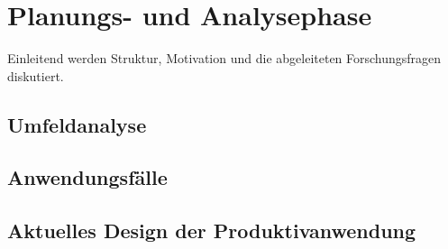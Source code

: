 

\chapter{Planungs- und Analysephase}

Einleitend werden Struktur, Motivation und die abgeleiteten Forschungsfragen diskutiert.

\section{Umfeldanalyse}
\blindtext

\section{Anwendungsfälle}
\blindtext

\section{Aktuelles Design der Produktivanwendung}
\blindtext
